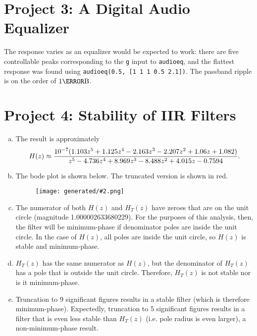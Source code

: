 \documentclass{ajhlabreport}
\newcommand{\generatedfigw}[2]{
	\texttt{[image: generated/\#2.png]}
}
\begin{document}
\chapter{Project 3: A Digital Audio Equalizer}%

The response varies as an equalizer would be expected to work: there are five
controllable peaks corresponding to the \texttt{g} input to \texttt{audioeq},
and the flattest response was found using \texttt{audioeq(0.5, [1 1 1 0.5
2.1])}. The passband ripple is on the order of $1\deci\bel$.

\begin{figure}[H]
\centering
{}
\end{figure}




\chapter{Project 4: Stability of IIR Filters}%

\begin{enumerate}[(a)]
%
\item The result is approximately
\begin{align*}
H(z) \approx \frac{10^{-7} (1.103 z^5 + 1.125 z^4 - 2.163 z^3 - 2.207 z^2 + 1.06 z + 1.082)}{z^5 - 4.736 z^4 + 8.969 z^3 - 8.488 z^2 + 4.015 z - 0.7594}\text.
\end{align*}
%
\setcounter{enumi}{2}
\item The bode plot is shown below. The truncated version is shown in
{\color{red}red}.
\begin{figure}[H]\centering\generatedfigw{0.9}{p4}\end{figure}
%
\item The numerator of both $H(z)$ and $H_T(z)$ have zeroes that are on the unit
circle (magnitude 1.000002633680229). For the purposes of this analysis, then,
the filter will be minimum-phase if denominator poles are inside the unit
circle. In the case of $H(z)$, all poles are inside the unit circle, so $H(z)$
is stable and minimum-phase.
%
\item $H_T(z)$ has the same numerator as $H(z)$, but the denominator of $H_T(z)$
has a pole that is outside the unit circle. Therefore, $H_T(z)$ is not stable
nor is it minimum-phase.
%
\item Truncation to 9 significant figures results in a stable filter (which is
therefore minimum-phase). Expectedly, truncation to 5 significant figures
results in a filter that is even less stable than $H_T(z)$ (i.e. pole radius is
even larger), a non-minimum-phase result.
%
\end{enumerate}
\end{document}
